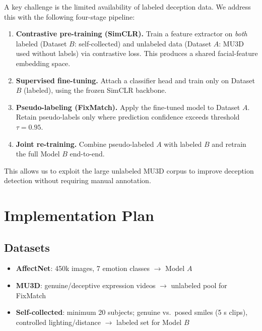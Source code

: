 \documentclass[10pt]{article}
\begin{document}
A key challenge is the limited availability of labeled deception data.
We address this with the following four-stage pipeline:

\begin{enumerate}[leftmargin=*, topsep=2pt, itemsep=2pt]
  \item \textbf{Contrastive pre-training (SimCLR).}
        Train a feature extractor on \emph{both} labeled (Dataset $B$: self-collected)
        and unlabeled data (Dataset $A$: MU3D used without labels) via
        contrastive loss. This produces a shared facial-feature embedding space.

  \item \textbf{Supervised fine-tuning.}
        Attach a classifier head and train only on Dataset $B$ (labeled),
        using the frozen SimCLR backbone.

  \item \textbf{Pseudo-labeling (FixMatch).}
        Apply the fine-tuned model to Dataset $A$. Retain pseudo-labels only
        where prediction confidence exceeds threshold $\tau = 0.95$.

  \item \textbf{Joint re-training.}
        Combine pseudo-labeled $A$ with labeled $B$ and retrain the full
        Model $B$ end-to-end.
\end{enumerate}

This allows us to exploit the large unlabeled MU3D corpus to improve deception
detection without requiring manual annotation.

\section{Implementation Plan}

\subsection{Datasets}

\begin{itemize}[leftmargin=*, topsep=2pt, itemsep=1pt]
  \item \textbf{AffectNet}: 450k images, 7 emotion classes $\rightarrow$ Model $A$
  \item \textbf{MU3D}: genuine/deceptive expression videos $\rightarrow$ unlabeled pool for FixMatch
  \item \textbf{Self-collected}: minimum 20 subjects; genuine vs.\ posed smiles (5 s clips),
        controlled lighting/distance $\rightarrow$ labeled set for Model $B$
\end{itemize}
\end{document}
